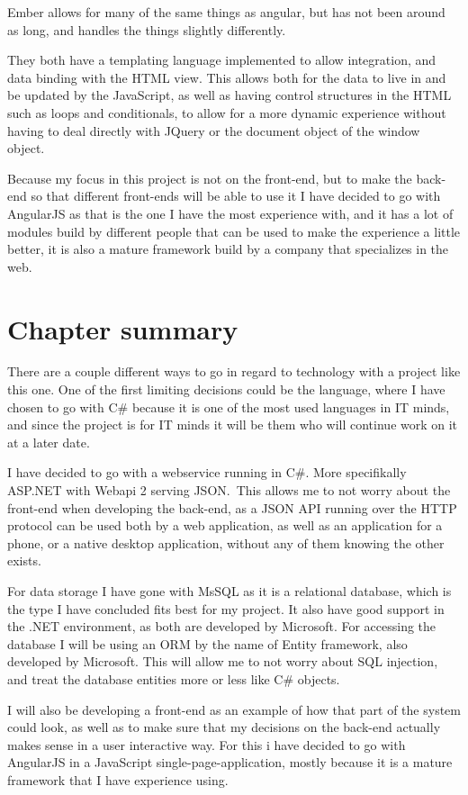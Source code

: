 Ember allows for many of the same things as angular, but has not been around as
long, and handles the things slightly differently\cite{emberjs}. 

They both have a templating language implemented to allow integration, and
data binding with the HTML view. This allows both for the data to live in and be
updated by the JavaScript, as well as having control structures in the HTML such
as loops and conditionals, to allow for a more dynamic experience without having
to deal directly with JQuery or the document object of the window object. 

Because my focus in this project is not on the front-end, but to make the back-end
so that different front-ends will be able to use it I have decided to go with
AngularJS as that is the one I have the most experience with, and it has a lot
of modules build by different people that can be used to make the experience a
little better, it is also a mature framework build by a company that specializes
in the web. 

\section{Chapter summary }
There are a couple different ways to go in regard to technology with a project
like this one. One of the first limiting decisions could be the language, where
I have chosen to go with C\# because it is one of the most used languages in IT
minds, and since the project is for IT minds it will be them who will continue
work on it at a later date.

I have decided to go with a webservice running in C\#. More specifikally
ASP.NET with Webapi 2 serving JSON.\ This allows me to not worry about the
front-end when developing the back-end, as a JSON API running over the HTTP
protocol can be used both by a web application, as well as an application for a
phone, or a native desktop application, without any of them knowing the other exists.

For data storage I have gone with MsSQL as it is a relational database, which is
the type I have concluded fits best for my project. It also have good support in
the .NET environment, as both are developed by Microsoft. For accessing the
database I will be using an ORM by the name of Entity framework, also developed
by Microsoft. This will allow me to not worry about SQL injection, and treat the
database entities more or less like C\# objects.

I will also be developing a front-end as an example of how that part of the
system could look, as well as to make sure that my decisions on the back-end
actually makes sense in a user interactive way. For this i have decided
to go with AngularJS in a JavaScript single-page-application, mostly because it is
a mature framework that I have experience using.
